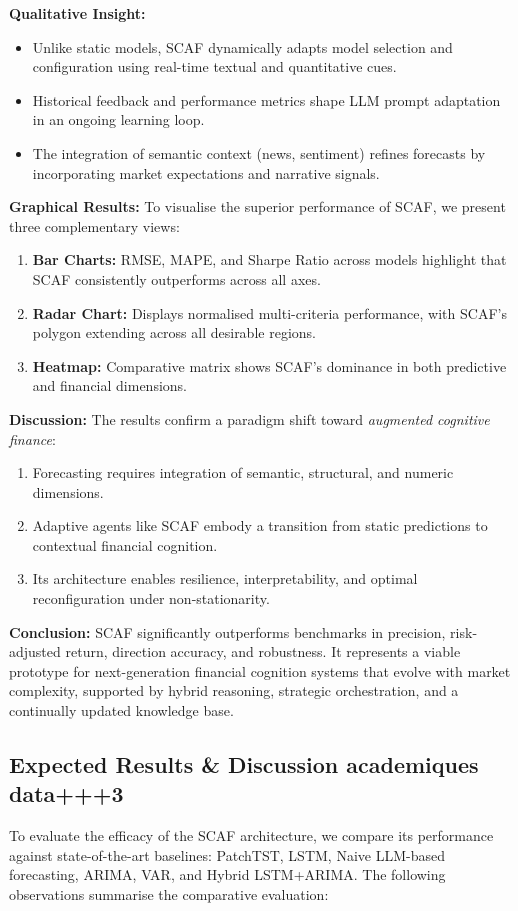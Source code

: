 \documentclass[conference]{IEEEtran}
\begin{document}
\textbf{Qualitative Insight:}
\begin{itemize}
    \item Unlike static models, SCAF dynamically adapts model selection and configuration using real-time textual and quantitative cues.
    \item Historical feedback and performance metrics shape LLM prompt adaptation in an ongoing learning loop.
    \item The integration of semantic context (news, sentiment) refines forecasts by incorporating market expectations and narrative signals.
\end{itemize}

\textbf{Graphical Results:}
To visualise the superior performance of SCAF, we present three complementary views:
\begin{enumerate}
    \item \textbf{Bar Charts:} RMSE, MAPE, and Sharpe Ratio across models highlight that SCAF consistently outperforms across all axes.
    \item \textbf{Radar Chart:} Displays normalised multi-criteria performance, with SCAF's polygon extending across all desirable regions.
    \item \textbf{Heatmap:} Comparative matrix shows SCAF’s dominance in both predictive and financial dimensions.
\end{enumerate}

\textbf{Discussion:}
The results confirm a paradigm shift toward \emph{augmented cognitive finance}:
\begin{enumerate}
    \item Forecasting requires integration of semantic, structural, and numeric dimensions.
    \item Adaptive agents like SCAF embody a transition from static predictions to contextual financial cognition.
    \item Its architecture enables resilience, interpretability, and optimal reconfiguration under non-stationarity.
\end{enumerate}

\textbf{Conclusion:}
SCAF significantly outperforms benchmarks in precision, risk-adjusted return, direction accuracy, and robustness. It represents a viable prototype for next-generation financial cognition systems that evolve with market complexity, supported by hybrid reasoning, strategic orchestration, and a continually updated knowledge base.
\subsection{Expected Results & Discussion academiques data+++3}
To evaluate the efficacy of the SCAF architecture, we compare its performance against state-of-the-art baselines: PatchTST, LSTM, Naive LLM-based forecasting, ARIMA, VAR, and Hybrid LSTM+ARIMA. The following observations summarise the comparative evaluation:
\end{document}
